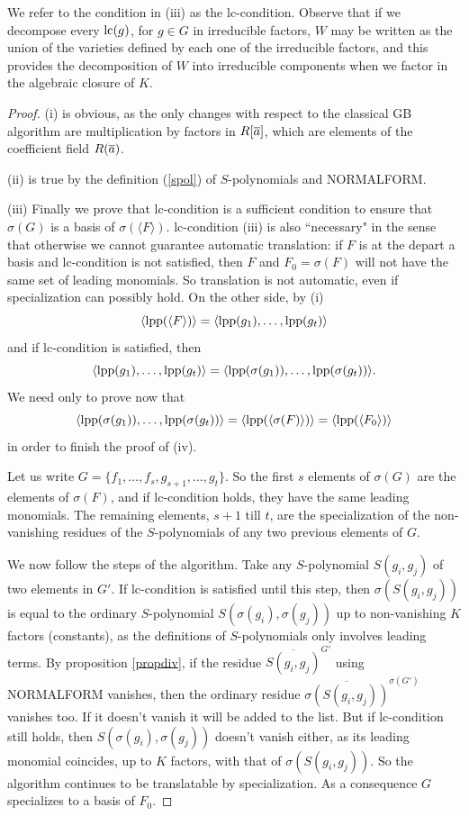We refer to the condition in (iii) as the lc-condition. Observe
that if we decompose every $\hbox{\rm lc}(g)$, for $g \in G$ in irreducible
factors, $W$ may be written as the union of the varieties defined
by each one of the irreducible factors, and this provides the
decomposition of $W$ into irreducible components when we factor in
the algebraic closure of $K$.

\begin{proof}
(i) is obvious, as the only changes with respect to the classical
{\sc GB} algorithm are multiplication by factors in $R[\overline{a}]$,
which are elements of the coefficient field $R(\overline{a})$.

(ii) is true by the definition (\ref{spol}) of $S$-polynomials and
{\sc NORMALFORM}.

(iii) Finally we prove that lc-condition is a sufficient condition
to ensure that $\sigma(G)$ is a \Gr basis of $\sigma(\langle
F\rangle)$. lc-condition (iii) is also ``necessary" in the sense
that otherwise we cannot guarantee automatic translation: if $F$
is at the depart a \Gr basis and lc-condition is not satisfied,
then $F$ and $F_0=\sigma(F)$ will not have the same set of leading
monomials. So translation is not automatic, even if specialization
can possibly hold. On the other side, by (i)
\[\langle \hbox{\rm lpp}(\langle F \rangle) \rangle = \langle \hbox{\rm lpp}(g_1), \dots,
  \hbox{\rm lpp}(g_t) \rangle\]
and if lc-condition is satisfied, then
\[\langle \hbox{\rm lpp}(g_1), \dots, \hbox{\rm lpp}(g_t) \rangle
 = \langle \hbox{\rm lpp}(\sigma(g_1)), \dots, \hbox{\rm lpp}(\sigma(g_t)) \rangle.\]
We need only to prove now that
\[\langle \hbox{\rm lpp}(\sigma(g_1)), \dots, \hbox{\rm lpp}(\sigma(g_t)) \rangle
=\langle \hbox{\rm lpp}(\langle \sigma(F) \rangle) \rangle = \langle
\hbox{\rm lpp}(\langle F_0 \rangle) \rangle
\]
in order to finish the proof of (iv).

Let us write $G=\{f_1,\dots,f_s,g_{s+1},\dots,g_t\}$. So the first
$s$ elements of $\sigma(G)$ are the elements of $\sigma(F)$, and
if lc-condition holds, they have the same leading monomials. The
remaining elements, $s+1$ till $t$, are the specialization of the
non-vanishing residues of the $S$-polynomials of any two previous
elements of $G$.

We now follow the steps of the algorithm. Take any $S$-polynomial
$S(g_i,g_j)$ of two elements in $G'$. If lc-condition is satisfied
until this step, then $\sigma(S(g_i,g_j))$ is equal to the
ordinary $S$-polynomial $S(\sigma(g_i),\sigma(g_j))$ up to
non-vanishing $K$ factors (constants), as the definitions of
$S$-polynomials only involves leading terms. By proposition
\ref{propdiv}, if the residue $\overline{S(g_i,g_j)}^{G'}$ using
{\sc NORMALFORM} vanishes, then the ordinary residue
$\overline{\sigma(S(g_i,g_j))}^{\sigma(G')}$ vanishes too. If it
doesn't vanish it will be added to the list. But if lc-condition
still holds, then $S(\sigma(g_i),\sigma(g_j))$ doesn't vanish
either, as its leading monomial coincides, up to $K$ factors, with
that of $\sigma(S(g_i,g_j))$. So the algorithm continues to be
translatable by specialization. As a consequence $G$ specializes
to a \Gr basis of $F_0$.
\end{proof}

